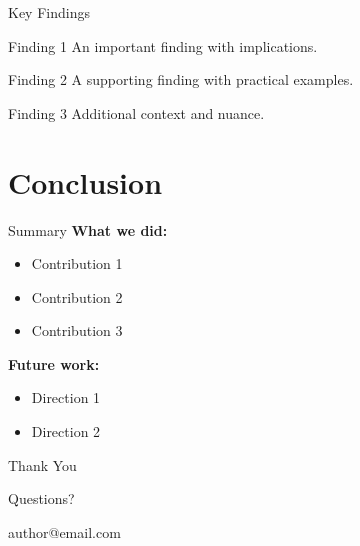 \documentclass[aspectratio=169]{beamer}
\begin{document}
\begin{frame}{Key Findings}
    \begin{alertblock}{Finding 1}
        An important finding with implications.
    \end{alertblock}

    \begin{exampleblock}{Finding 2}
        A supporting finding with practical examples.
    \end{exampleblock}

    \begin{block}{Finding 3}
        Additional context and nuance.
    \end{block}
\end{frame}

\section{Conclusion}

\begin{frame}{Summary}
    \textbf{What we did:}
    \begin{itemize}
        \item Contribution 1
        \item Contribution 2
        \item Contribution 3
    \end{itemize}

    \vspace{1em}
    \textbf{Future work:}
    \begin{itemize}
        \item Direction 1
        \item Direction 2
    \end{itemize}
\end{frame}

\begin{frame}
    \centering
    \vspace{2cm}
    {\Huge\textcolor{primary}{Thank You}}

    \vspace{1em}
    {\large Questions?}

    \vspace{2em}
    {\small author@email.com}
\end{frame}
\end{document}
